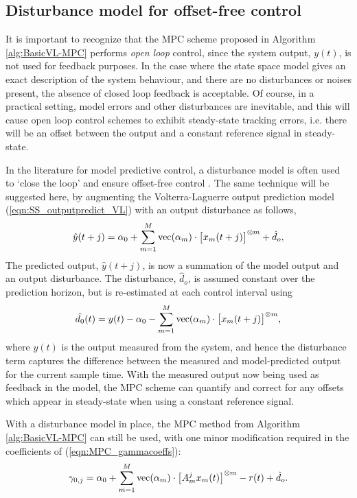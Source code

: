 \subsection{Disturbance model for offset-free control}
\label{sec:DisturbanceModel_MPC}

It is important to recognize that the MPC scheme proposed in Algorithm \ref{alg:BasicVL-MPC} performs \emph{open loop} control, since the system output, $y(t)$, is not used for feedback purposes. In the case where the state space model gives an exact description of the system behaviour, and there are no disturbances or noises present, the absence of closed loop feedback is acceptable. Of course, in a practical setting, model errors and other disturbances are inevitable, and this will cause open loop control schemes to exhibit steady-state tracking errors, i.e. there will be an offset between the output and a constant reference signal in steady-state.

In the literature for model predictive control, a disturbance model is often used to `close the loop' and ensure offset-free control \cite{Muske2002}. The same technique will be suggested here, by augmenting the Volterra-Laguerre output prediction model (\ref{eqn:SS_outputpredict_VL}) with an output disturbance as follows,
\begin{align}
\hat{y}(t+j) = \alpha_0 + \sum_{m=1}^M \operatorname{vec}(\alpha_m) \cdot \big[ x_m(t+j) \big]^{\otimes m} + \hat{d}_o  \label{eqn:SS_outputpredict_VL+dist},
\end{align}
The predicted output, $\hat{y}(t+j)$, is now a summation of the model output and an output disturbance. The disturbance, $\hat{d}_o$, is assumed constant over the prediction horizon, but is re-estimated at each control interval using
\begin{equation}
\hat{d_0}(t) = y(t) - \alpha_0 - \sum_{m=1}^M \operatorname{vec}(\alpha_m) \cdot \big[ x_m(t+j) \big]^{\otimes m},
\end{equation}
where $y(t)$ is the output measured from the system, and hence the disturbance term captures the difference between the measured and model-predicted output for the current sample time. With the measured output now being used as feedback in the model, the MPC scheme can quantify and correct for any offsets which appear in steady-state when using a constant reference signal.

With a disturbance model in place, the MPC method from Algorithm \ref{alg:BasicVL-MPC} can still be used, with one minor modification required in the coefficients of (\ref{eqn:MPC_gammacoeffs}):
\begin{equation}
\gamma_{0,j} = \alpha_0 + \sum_{m=1}^M \operatorname{vec}(\alpha_m) \cdot \big[ A_m^j x_m(t) \big]^{\otimes m} - r(t) + \hat{d}_o.
\end{equation}

